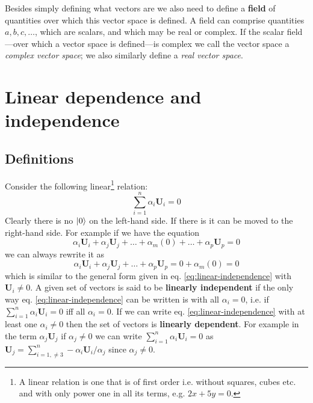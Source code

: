 \documentclass[english,seminar,headertitle]{lecture}
\begin{document}
Besides simply defining what vectors are we also need to define a \textbf{field} of quantities over which this vector space is defined. A field can comprise quantities $a, b, c, \ldots$, which are scalars, and which may be real or complex. If the scalar field---over which a vector space is defined---is complex we call the vector space a \textit{complex vector space}; we also similarly define a \textit{real vector space}.

\vspace{0.35cm}

\noindent{}

\section{Linear dependence and independence}
\subsection{Definitions}

Consider the following linear\footnote{A linear relation is one that is of first order i.e. without squares, cubes etc. and with only power one in all its terms, e.g. $2x + 5y = 0$.} relation:
\begin{equation}
	\sum_{i=1}^n \alpha_i \mathbf{U}_i = 0 \label{eq:linear-independence}
\end{equation}
Clearly there is no $\ket{0}$ on the left-hand side. If there is it can be moved to the right-hand side. For example if we have the equation
\[
\alpha_i\mathbf{U}_i + \alpha_j\mathbf{U}_j + \ldots + \alpha_m (0) + \ldots + \alpha_p\mathbf{U}_p = 0
\]
we can always rewrite it as
\[
\alpha_i\mathbf{U}_i + \alpha_j\mathbf{U}_j + \ldots + \alpha_p\mathbf{U}_p = 0 + \alpha_m (0) = 0
\]
which is similar to the general form given in eq. \eqref{eq:linear-independence} with $\mathbf{U}_i \neq 0$. A given set of vectors is said to be \textbf{linearly independent} if the only way eq. \eqref{eq:linear-independence} can be written is with all $\alpha_i = 0$, i.e. if $\sum_{i=1}^n \alpha_i \mathbf{U}_i = 0$ iff all $\alpha_i = 0$. If we can write eq. \eqref{eq:linear-independence} with at least one $\alpha_i \neq 0$ then the set of vectors is \textbf{linearly dependent}. For example in the term $\alpha_j \mathbf{U}_j$ if $\alpha_j \neq 0$ we can write $\sum_{i=1}^n \alpha_i \mathbf{U}_i = 0$ as $\mathbf{U}_j = \sum_{i=1, \neq 3}^n -\alpha_i \mathbf{U}_i / \alpha_j$ since $\alpha_j \neq 0$.
\end{document}
